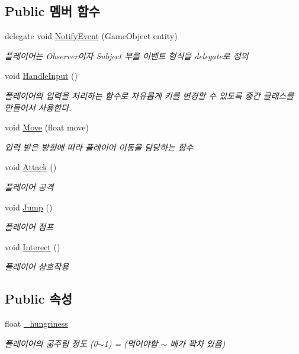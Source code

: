 \subsection*{Public 멤버 함수}
\begin{DoxyCompactItemize}
\item 
delegate void \mbox{\hyperlink{class_player_controller_a934c7f80b80276620cd60eaaeea7520e}{Notify\+Event}} (Game\+Object entity)
\begin{DoxyCompactList}\small\item\em 플레이어는 Observer이자 Subject 부를 이벤트 형식을 delegate로 정의 \end{DoxyCompactList}\item 
void \mbox{\hyperlink{class_player_controller_a5ebfe098b2dc258ca8349e6951766883}{Handle\+Input}} ()
\begin{DoxyCompactList}\small\item\em 플레이어의 입력을 처리하는 함수로 자유롭게 키를 변경할 수 있도록 중간 클래스를 만들어서 사용한다. \end{DoxyCompactList}\item 
void \mbox{\hyperlink{class_player_controller_a74676e263dd0a0a9a03a389fa9758bd6}{Move}} (float move)
\begin{DoxyCompactList}\small\item\em 입력 받은 방향에 따라 플레이어 이동을 담당하는 함수 \end{DoxyCompactList}\item 
void \mbox{\hyperlink{class_player_controller_a473a610cfe2a374d5cb39b3c44881d11}{Attack}} ()
\begin{DoxyCompactList}\small\item\em 플레이어 공격 \end{DoxyCompactList}\item 
void \mbox{\hyperlink{class_player_controller_a8a7010cb6f3c524737be3f6f77553df9}{Jump}} ()
\begin{DoxyCompactList}\small\item\em 플레이어 점프 \end{DoxyCompactList}\item 
void \mbox{\hyperlink{class_player_controller_a2af84a2de0a9c5b304d91cc674e76fc1}{Interect}} ()
\begin{DoxyCompactList}\small\item\em 플레이어 상호작용 \end{DoxyCompactList}\end{DoxyCompactItemize}
\subsection*{Public 속성}
\begin{DoxyCompactItemize}
\item 
float \mbox{\hyperlink{class_player_controller_ab4fed78a016e8baca12e50bb3d7f034a}{\+\_\+hungriness}}
\begin{DoxyCompactList}\small\item\em 플레이어의 굶주림 정도 (0$\sim$1) = (먹어야함 $\sim$ 배가 꽉차 있음) \end{DoxyCompactList}\end{DoxyCompactItemize}

